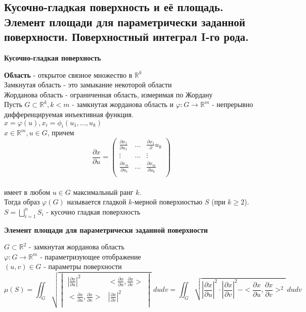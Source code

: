 \subsection{Кусочно-гладкая поверхность и её площадь. Элемент площади для параметрически заданной поверхности. Поверхностный интеграл I-го рода.}
\begin{center}
        \textbf{Кусочно-гладкая поверхность}
    \end{center}
    \textbf{Область} - открытое связное множество в $\mathbb{R}^k$\\
    Замкнутая область - это замыкание некоторой области\\
    Жорданова область - ограниченная область, измеримая по Жордану\\
    Пусть $G \subset \mathbb{R}^k, k<m$ - замкнутая жорданова область и $\varphi: G \rightarrow \mathbb{R}^m$ - непрерывно дифференцируемая инъективная функция.\\
    $x= \varphi(u), x_i = \phi_i(u_1, ..., u_k)$\\
    $x \in \mathbb{R}^m, u \in G$, причем \\
    $$\frac{\partial x}{\partial u} = 
    \begin{pmatrix}
    \frac{\partial x_1}{\partial u_1} & ... & \frac{\partial x_1}{\partial }u_k \\
    \vdots & ... & \vdots \\
    \frac{\partial x_m}{\partial u_1} & ... & \frac{\partial x_m}{\partial u_k} \\
    \end{pmatrix}$$\\
    имеет в любом $u \in G$ максимальный ранг $k$.\\
    Тогда образ $\varphi(G)$ называется гладкой $k$-мерной поверхностью $S$ (при $k \geq 2$).\\
    $S = \bigsqcup_{i=1}^{n} S_i$ - кусочно гладкая поверхность\\
    
    \begin{center}
        \textbf{Элемент площади для параметрически заданной поверхности}
    \end{center}
    $G \subset \mathbb{R}^2$ - замкнутая жорданова область\\
    $\varphi: G \rightarrow \mathbb{R}^m$ - параметризующее отображение\\
    $(u, v) \in G$ - параметры поверхности\\
    $$\mu(S) = \iint_G \sqrt{
    \begin{vmatrix}
    |\frac{\partial x}{\partial u}|^2 & <\frac{\partial x}{\partial u}, \frac{\partial x}{\partial v}>\\
    <\frac{\partial x}{\partial u}, \frac{\partial x}{\partial v}> & |\frac{\partial x}{\partial v}|^2\\
    \end{vmatrix}
    }\ dudv = \iint_G \sqrt{|\frac{\partial x}{\partial u}|^2 \cdot |\frac{\partial x}{\partial v}|^2 - <\frac{\partial x}{\partial u}, \frac{\partial x}{\partial v}>^2}\ dudv$$
    
